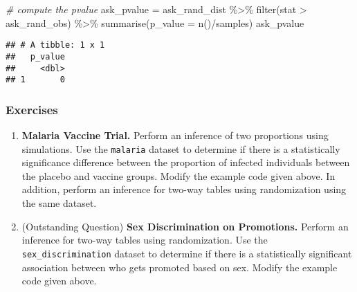 \documentclass[
]{article}
\newenvironment{Shaded}{\begin{snugshade}}{\end{snugshade}}
\newcommand{\AttributeTok}[1]{\textcolor[rgb]{0.77,0.63,0.00}{#1}}
\newcommand{\CommentTok}[1]{\textcolor[rgb]{0.56,0.35,0.01}{\textit{#1}}}
\newcommand{\FunctionTok}[1]{\textcolor[rgb]{0.00,0.00,0.00}{#1}}
\newcommand{\NormalTok}[1]{#1}
\newcommand{\OtherTok}[1]{\textcolor[rgb]{0.56,0.35,0.01}{#1}}
\newcommand{\SpecialCharTok}[1]{\textcolor[rgb]{0.00,0.00,0.00}{#1}}
\begin{document}
\begin{itemize}
\begin{Shaded}
\begin{Highlighting}[]
\CommentTok{\# compute the pvalue}
\NormalTok{ask\_pvalue }\OtherTok{=}\NormalTok{ ask\_rand\_dist }\SpecialCharTok{\%\textgreater{}\%}
  \FunctionTok{filter}\NormalTok{(stat }\SpecialCharTok{\textgreater{}}\NormalTok{ ask\_rand\_obs) }\SpecialCharTok{\%\textgreater{}\%}
  \FunctionTok{summarise}\NormalTok{(}\AttributeTok{p\_value =} \FunctionTok{n}\NormalTok{()}\SpecialCharTok{/}\NormalTok{samples)}
\NormalTok{ask\_pvalue}
\end{Highlighting}
\end{Shaded}

\begin{verbatim}
## # A tibble: 1 x 1
##   p_value
##     <dbl>
## 1       0
\end{verbatim}
\end{itemize}

\newpage

\hypertarget{exercises}{%
\subsubsection{Exercises}\label{exercises}}

\begin{enumerate}
\def\labelenumi{\arabic{enumi}.}
\item
  \textbf{Malaria Vaccine Trial.} Perform an inference of two proportions using simulations. Use the \texttt{malaria} dataset to determine if there is a statistically significance difference between the proportion of infected individuals between the placebo and vaccine groups. Modify the example code given above. In addition, perform an inference for two-way tables using randomization using the same dataset.
\item
  (Outstanding Question) \textbf{Sex Discrimination on Promotions.} Perform an inference for two-way tables using randomization. Use the \texttt{sex\_discrimination} dataset to determine if there is a statistically significant association between who gets promoted based on sex. Modify the example code given above.
\end{enumerate}
\end{document}

